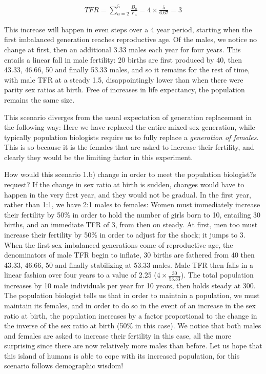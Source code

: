 \documentclass[reqno,12pt,oneside,a4paper]{report} %
\theoremstyle{plain}
\theoremstyle{definition}
\theoremstyle{remark}
\numberwithin{theorem}{chapter}     %
\begin{document}
\begin{align}
TFR = \sum_{a=2}^{5} \frac{B_a}{F_a} = 4 \times\frac{5}{6.67} = 3 
\end{align}

This increase will happen in even steps over a 4 year period, starting when the first imbalanced generation reaches reproductive age. Of the males, we notice no change at first, then an additional 3.33 males each year for four years. This entails a linear fall in male fertility: 20 births are first produced by 40, then 43.33, 46.66, 50 and finally 53.33 males, and so it remains for the rest of time, with male TFR at a steady 1.5, disappointingly lower than when there were parity sex ratios at birth. Free of increases in life expectancy, the population remains the same size.

This scenario diverges from the usual expectation of generation replacement in the following way: Here we have replaced the entire mixed-sex generation, while typically population biologists require us to fully replace a \textit{generation of females}. This is so because it is the females that are asked to increase their fertility, and clearly they would be the limiting factor in this experiment. 

How would this scenario 1.b) change in order to meet the population biologist?s request? If the change in sex ratio at birth is sudden, changes would have to happen in the very first year, and they would not be gradual. In the first year, rather than 1:1, we have 2:1 males to females: Women must immediately increase their fertility by 50\% in order to hold the number of girls born to 10, entailing 30 births, and an immediate TFR of 3, from then on steady. At first, men too must increase their fertility by 50\% in order to adjust for the shock; it jumps to 3. When the first sex imbalanced generations come of reproductive age, the denominators of male TFR begin to inflate, 30 births are fathered from 40 then 43.33, 46.66, 50 and finally stabilizing at 53.33 males. Male TFR then falls in a linear fashion over four years to a value of 2.25 ($4\times\frac{30}{53.33}$). The total population increases by 10 male individuals per year for 10 years, then holds steady at 300. The population biologist tells us that in order to maintain a population, we must maintain its females, and in order to do so in the event of an increase in the sex ratio at birth, the population increases by a factor proportional to the change in the inverse of the sex ratio at birth (50\% in this case). We notice that both males and females are asked to increase their fertility in this case, all the more surprising since there are now relatively more males than before. Let us hope that this island of humans is able to cope with its increased population, for this scenario follows demographic wisdom!
\end{document}
